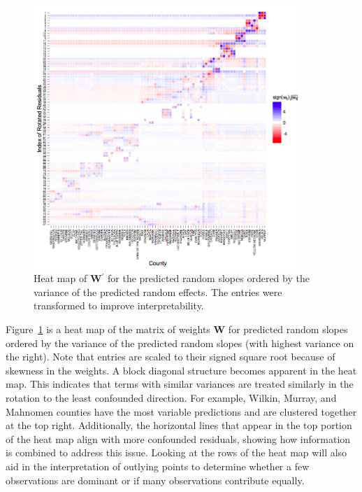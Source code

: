 \documentclass{article} %
\newcommand{\trans}{\ensuremath{^\prime}}
\begin{document}
\begin{figure}[htb]
\centering
	\includegraphics[width=0.9\textwidth]{tmslope-image.png}
	\caption{\label{fig:matimage} Heat map of $\bm{W}\trans$ for the predicted random slopes ordered by the variance of the predicted random effects. The entries were transformed to improve interpretability.
	}
	
\end{figure}

Figure~\ref{fig:matimage} is a heat map of the  matrix of weights $\bm{W}$ for predicted random slopes  ordered by the variance of the predicted random slopes (with highest variance on the right).  Note that entries are scaled to their signed square root because of skewness in the weights. A block diagonal structure becomes apparent  in the heat map. This indicates  that terms with similar variances are treated similarly in the rotation to the least confounded direction. For example, Wilkin, Murray, and Mahnomen counties have the most variable predictions and are clustered together at the top right. Additionally, the horizontal lines that appear in the top portion of the heat map align with more confounded residuals, showing how information is combined to address this issue. Looking at the rows of the heat map will also aid in the interpretation of outlying points to determine whether a few observations are dominant or if many observations contribute equally.
\end{document}

